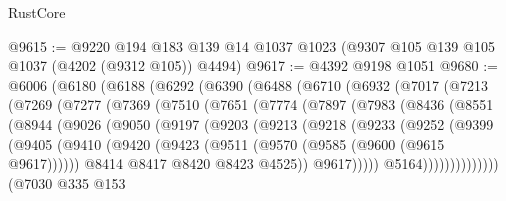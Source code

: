 \begin{lexlean}{RustCore}
\begin{coremodule}
@9615 := @9220
    @194
    @183
    @139
    @14
    @1037
    @1023
    (@9307 @105 @139 @105 @1037 (@4202 (@9312 @105)) @4494)
@9617 := @4392 @9198 @1051
@9680 := @6006
    (@6180
      (@6188
        (@6292
          (@6390
            (@6488
              (@6710
                (@6932
                  (@7017
                    (@7213
                      (@7269
                        (@7277
                          (@7369
                            (@7510
                              (@7651
                                (@7774
                                  (@7897
                                    (@7983
                                      (@8436
                                        (@8551
                                          (@8944
                                            (@9026
                                              (@9050
                                                (@9197
                                                  (@9203
                                                    (@9213
                                                      (@9218
                                                        (@9233
                                                          (@9252
                                                            (@9399
                                                              (@9405
                                                                (@9410
                                                                  (@9420
                                                                    (@9423
                                                                      (@9511
                                                                        (@9570
                                                                          (@9585
                                                                            (@9600
                                                                              (@9615 @9617))))))
                                                                    @8414
                                                                    @8417
                                                                    @8420
                                                                    @8423
                                                                    @4525))
                                                                @9617)))))
                                                      @5164))))))))))))))
                          (@7030
                            @335
                            @153

\end{coremodule}
\end{lexlean}
